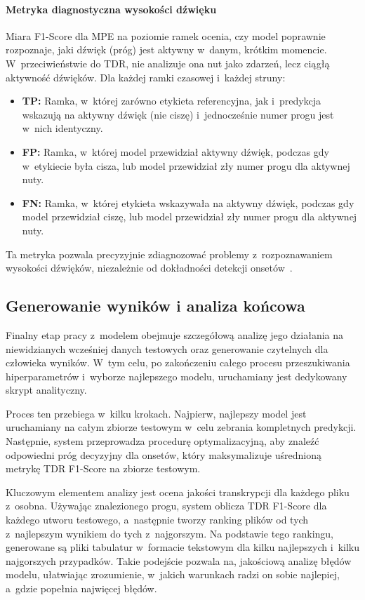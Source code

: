 \paragraph{Metryka diagnostyczna wysokości dźwięku}
Miara F1-Score dla MPE na poziomie ramek ocenia, czy model poprawnie rozpoznaje, jaki dźwięk (próg) jest aktywny w~danym, krótkim momencie. W~przeciwieństwie do TDR, nie analizuje ona nut jako zdarzeń, lecz ciągłą aktywność dźwięków. Dla każdej ramki czasowej i~każdej struny:
\begin{itemize}
    \item \textbf{TP:} Ramka, w~której zarówno etykieta referencyjna, jak i~predykcja wskazują na aktywny dźwięk (nie ciszę) i~jednocześnie numer progu jest w~nich identyczny.
    \item \textbf{FP:} Ramka, w~której model przewidział aktywny dźwięk, podczas gdy w~etykiecie była cisza, lub model przewidział zły numer progu dla aktywnej nuty.
    \item \textbf{FN:} Ramka, w~której etykieta wskazywała na aktywny dźwięk, podczas gdy model przewidział ciszę, lub model przewidział zły numer progu dla aktywnej nuty.
\end{itemize}
Ta metryka pozwala precyzyjnie zdiagnozować problemy z~rozpoznawaniem wysokości dźwięków, niezależnie od dokładności detekcji onsetów~\autocite{Bittner2022BasicPitch}.
\subsection{Generowanie wyników i analiza końcowa}
\label{ssec:generowanie_wynikow_analiza_koncowa}

Finalny etap pracy z~modelem obejmuje szczegółową analizę jego działania na niewidzianych wcześniej danych testowych oraz generowanie czytelnych dla człowieka wyników. W~tym celu, po zakończeniu całego procesu przeszukiwania hiperparametrów i~wyborze najlepszego modelu, uruchamiany jest dedykowany skrypt analityczny.

Proces ten przebiega w~kilku krokach. Najpierw, najlepszy model jest uruchamiany na całym zbiorze testowym w~celu zebrania kompletnych predykcji. Następnie, system przeprowadza procedurę optymalizacyjną, aby znaleźć odpowiedni próg decyzyjny dla onsetów, który maksymalizuje uśrednioną metrykę TDR F1-Score na zbiorze testowym.

Kluczowym elementem analizy jest ocena jakości transkrypcji dla każdego pliku z~osobna. Używając znalezionego progu, system oblicza TDR F1-Score dla każdego utworu testowego, a~następnie tworzy ranking plików od tych z~najlepszym wynikiem do tych z~najgorszym. Na podstawie tego rankingu, generowane są pliki tabulatur w~formacie tekstowym dla kilku najlepszych i~kilku najgorszych przypadków. Takie podejście pozwala na, jakościową analizę błędów modelu, ułatwiając zrozumienie, w~jakich warunkach radzi on sobie najlepiej, a~gdzie popełnia najwięcej błędów.

